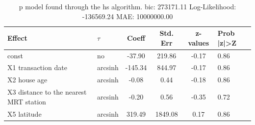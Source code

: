 \begin{table}
	\caption{p model found through the hs algorithm. bic: 273171.11 Log-Likelihood: -136569.24 MAE: 10000000.00}
	\begin{center}
		\begin{tabular}{|l|l|c|c|c|l|}
			\hline
			Effect & $\tau$ & Coeff & Std. Err & z-values & Prob |z|>Z \\
			\hline
			const & no & -37.90 & 219.86 & -0.17 & 0.86 \\
			\hline
			X1 transaction date & arcsinh & -145.34 & 844.97 & -0.17 & 0.86 \\
			\hline
			X2 house age & arcsinh & -0.08 & 0.44 & -0.18 & 0.86 \\
			\hline
			X3 distance to the nearest MRT station & arcsinh & -0.20 & 0.56 & -0.35 & 0.72 \\
			\hline
			X5 latitude & arcsinh & 319.49 & 1849.08 & 0.17 & 0.86 \\
			\hline
		\end{tabular}
	\end{center}
\end{table}
